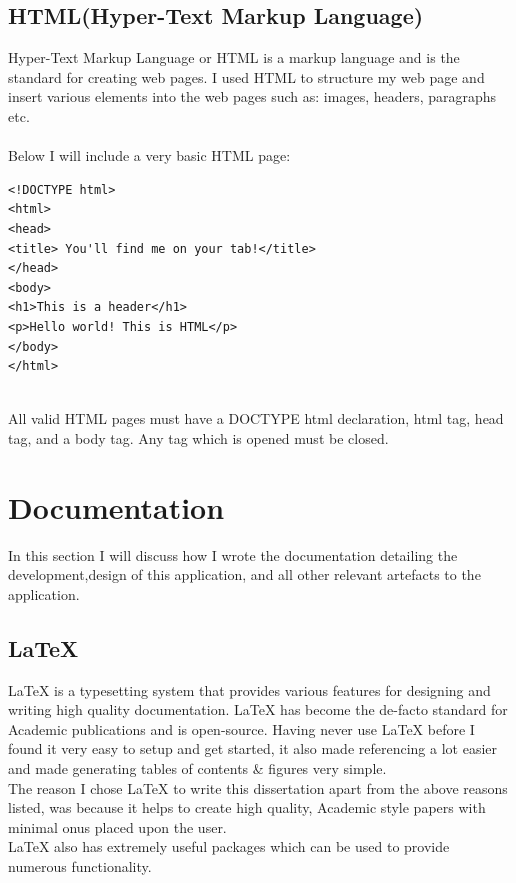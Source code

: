\subsection{HTML(Hyper-Text Markup Language)}
Hyper-Text Markup Language or HTML is a markup language and is the standard for creating web pages\cite{HTML}.  I used HTML to structure my web page and insert various elements into the web pages such as: images, headers, paragraphs etc.
\\
\\
Below I will include a very basic HTML page:
\begin{verbatim}
<!DOCTYPE html>
<html>
<head>
<title> You'll find me on your tab!</title>
</head>
<body>
<h1>This is a header</h1>
<p>Hello world! This is HTML</p>
</body>
</html>
\end{verbatim}
\\
All valid HTML pages must have a DOCTYPE html declaration, html tag, head tag, and a body tag.  Any tag which is opened must be closed.
\section{Documentation}
In this section I will discuss how I wrote the documentation detailing the development,design of this application, and all other relevant artefacts to the application.
\subsection{\LaTeX}
\LaTeX \hspace{0.1cm} is a typesetting system that provides various features for designing and writing high quality documentation\cite{Latex}.  \LaTeX\hspace{0.1cm} has become the de-facto standard for Academic publications and is open-source. Having never use \LaTeX\hspace{0.1cm} before I found it very easy to setup and get started, it also made referencing a lot easier and made generating tables of contents \& figures very simple.
\\
The reason I chose \LaTeX \hspace{0.1cm} to write this dissertation apart from the above reasons listed, was because it helps to create high quality, Academic style papers with minimal onus placed upon the user.
\\
\LaTeX \hspace{0.1cm} also has extremely useful packages which can be used to provide numerous functionality.
